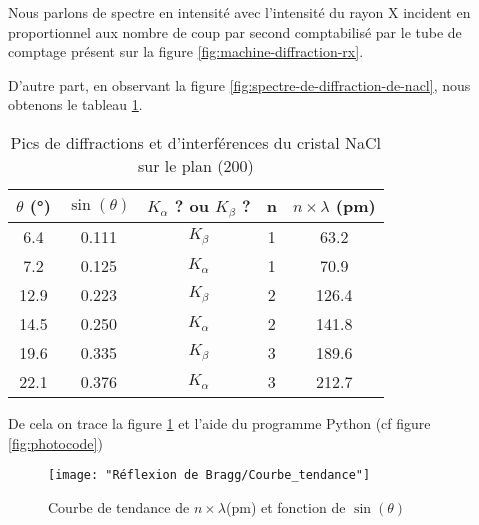 \begin{flushleft}
	Nous parlons de spectre en intensité avec l'intensité du rayon X incident en proportionnel aux nombre de coup par second comptabilisé par le tube de comptage présent sur la figure \ref{fig:machine-diffraction-rx}.
	
	D'autre part, en observant la figure \ref{fig:spectre-de-diffraction-de-nacl}, nous obtenons le tableau \ref{tab:Pic_de_diffraction_et_d'interférence_du_cristal_NaCl_sur_le_plan_200}.
\end{flushleft}

\begin{table}[h!]
	\centering
	\begin{tabular}{|c|c|c|c|c|}
		\hline
		$\theta$ (°) & $\sin(\theta)$ &$K_{\alpha}$ ? ou $K_{\beta}$ ? & n & $n \times \lambda $ (pm) \\ \hline
		6.4       & 0.111      & $K_{\beta}$                     & 1 & 63.2 \\ \hline
		7.2       & 0.125      &$K_{\alpha}$                    & 1 & 70.9 \\ \hline
		12.9      & 0.223      & $K_{\beta}$                     & 2  & 126.4\\ \hline
		14.5      & 0.250      &$K_{\alpha}$                    & 2  & 141.8\\ \hline
		19.6      & 0.335      & $K_{\beta}$                     & 3  & 189.6\\ \hline
		22.1      & 0.376      &$K_{\alpha}$                    & 3  & 212.7 \\ \hline
	\end{tabular}	
	\caption{Pics de diffractions et d'interférences du cristal NaCl sur le plan (200)}
	\label{tab:Pic_de_diffraction_et_d'interférence_du_cristal_NaCl_sur_le_plan_200}
\end{table}



\newpage
De cela on trace la figure \ref{fig:courbetendance} et l'aide du programme Python (cf figure \ref{fig:photocode})


\begin{figure}[h!]
	\centering
	\texttt{[image: "Réflexion de Bragg/Courbe\_tendance"]}
	\caption{Courbe de tendance de $n \times \lambda $(pm) et fonction de 	$\sin(\theta)$ }
	\label{fig:courbetendance}
\end{figure}

